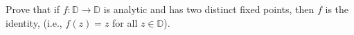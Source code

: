 Prove that if $f : \mathbb{D} \to \mathbb{D}$ is analytic and has two distinct fixed points, then $f$ is the identity,
(i.e., $f(z) = z$ for all $z \in \mathbb{D}$).

\begin{solution}
  \ \\
\end{solution}